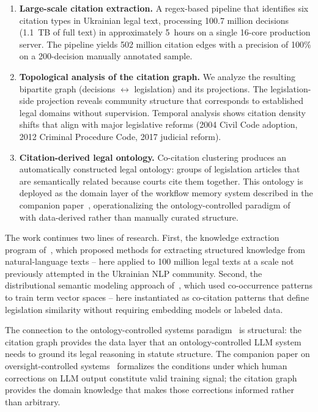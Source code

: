 \documentclass[11pt]{article}
\begin{document}
\begin{enumerate}[leftmargin=*, nosep]
  \item \textbf{Large-scale citation extraction.} A regex-based pipeline that identifies six citation types in Ukrainian legal text, processing 100.7 million decisions (1.1~TB of full text) in approximately 5~hours on a single 16-core production server. The pipeline yields 502 million citation edges with a precision of 100\% on a 200-decision manually annotated sample.

  \item \textbf{Topological analysis of the citation graph.} We analyze the resulting bipartite graph (decisions $\leftrightarrow$ legislation) and its projections. The legislation-side projection reveals community structure that corresponds to established legal domains without supervision. Temporal analysis shows citation density shifts that align with major legislative reforms (2004 Civil Code adoption, 2012 Criminal Procedure Code, 2017 judicial reform).

  \item \textbf{Citation-derived legal ontology.} Co-citation clustering produces an automatically constructed legal ontology: groups of legislation articles that are semantically related because courts cite them together. This ontology is deployed as the domain layer of the workflow memory system described in the companion paper~\citep{ovcharov2026workflowmemory}, operationalizing the ontology-controlled paradigm of~\citet{palagin2006architecture} with data-derived rather than manually curated structure.
\end{enumerate}

The work continues two lines of research.
First, the knowledge extraction program of~\citet{palagin2012knowledge}, which proposed methods for extracting structured knowledge from natural-language texts -- here applied to 100 million legal texts at a scale not previously attempted in the Ukrainian NLP community.
Second, the distributional semantic modeling approach of~\citet{palagin2020distributional}, which used co-occurrence patterns to train term vector spaces -- here instantiated as co-citation patterns that define legislation similarity without requiring embedding models or labeled data.

The connection to the ontology-controlled systems paradigm~\citep{palagin2006architecture,palagin2023ontochatgpt} is structural: the citation graph provides the data layer that an ontology-controlled LLM system needs to ground its legal reasoning in statute structure.
The companion paper on oversight-controlled systems~\citep{ovcharov2026bridge} formalizes the conditions under which human corrections on LLM output constitute valid training signal; the citation graph provides the domain knowledge that makes those corrections informed rather than arbitrary.
\end{document}
